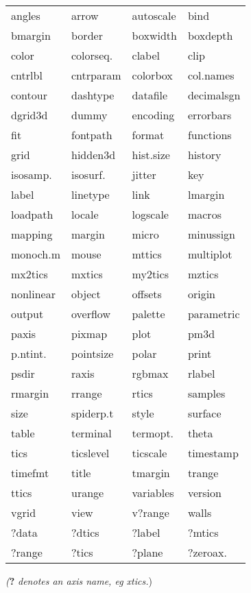 {\footnotesize 
\begin{tabular}{@{}l l l l}
    angles      & arrow     & autoscale &   bind        \\
    bmargin     & border    & boxwidth  & boxdepth      \\
    color       & colorseq. & clabel    & clip          \\
    cntrlbl     & cntrparam & colorbox  & col.names    \\
    contour     & dashtype  & datafile  & decimalsgn    \\
    dgrid3d     & dummy     & encoding  & errorbars     \\
    fit         & fontpath  & format    & functions     \\
    grid        & hidden3d  & hist.size & history       \\
    isosamp.    & isosurf.  & jitter    & key           \\
    label       & linetype  & link      & lmargin       \\
    loadpath    & locale    & logscale  & macros        \\
    mapping     & margin    & micro     & minussign     \\
    monoch.m    & mouse     & mttics    & multiplot     \\
    mx2tics     & mxtics    & my2tics   & mztics        \\
    nonlinear   & object    & offsets   & origin        \\
    output      & overflow  & palette   & parametric    \\
    paxis       & pixmap    & plot      & pm3d          \\
    p.ntint.    & pointsize & polar     & print         \\
    psdir       & raxis     & rgbmax    & rlabel        \\
    rmargin     & rrange    & rtics     & samples       \\
    size        & spiderp.t & style     & surface       \\
    table       & terminal  & termopt.  & theta         \\
    tics        & ticslevel & ticscale  & timestamp      \\
    timefmt     & title     & tmargin   & trange        \\
    ttics       & urange    & variables & version       \\
    vgrid       & view      & v?range   & walls         \\
    ?data       & ?dtics    & ?label    & ?mtics        \\
    ?range      & ?tics     & ?plane    & ?zeroax.      \\
\end{tabular}}
\textit{(}\textbf{?}\textit{ denotes an axis name, eg xtics.})\\ 


